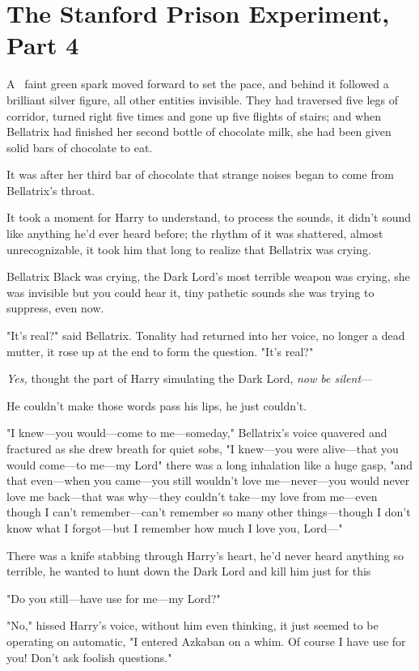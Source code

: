 \chapter{The Stanford Prison Experiment, Part 4}

\lettrine{A}{~} faint green
spark moved forward to set the pace, and behind it followed a brilliant silver
figure, all other entities invisible. They had traversed five legs of corridor,
turned right five times and gone up five flights of stairs; and when Bellatrix
had finished her second bottle of chocolate milk, she had been given solid bars
of chocolate to eat.

It was after her third bar of chocolate that strange noises began to come from
Bellatrix's throat.

It took a moment for Harry to understand, to process the sounds, it didn't
sound like anything he'd ever heard before; the rhythm of it was shattered,
almost unrecognizable, it took him that long to realize that Bellatrix was
crying.

Bellatrix Black was crying, the Dark Lord's most terrible weapon was crying,
she was invisible but you could hear it, tiny pathetic sounds she was trying to
suppress, even now.

"It's real?" said Bellatrix. Tonality had returned into her voice, no longer a
dead mutter, it rose up at the end to form the question. "It's real?"

\emph{Yes,} thought the part of Harry simulating the Dark Lord, \emph{now be
silent}---

He couldn't make those words pass his lips, he just couldn't.

"I knew---you would---come to me---someday," Bellatrix's voice quavered and
fractured as she drew breath for quiet sobs, "I knew---you were alive---that
you would come---to me---my Lord{\el}" there was a long inhalation like a
huge gasp, "and that even---when you came---you still wouldn't love
me---never---you would never love me back---that was why---they couldn't
take---my love from me---even though I can't remember---can't remember so many
other things---though I don't know what I forgot---but I remember how much I
love you, Lord---"

There was a knife stabbing through Harry's heart, he'd never heard anything so
terrible, he wanted to hunt down the Dark Lord and kill him just for
this{\el}

"Do you still---have use for me---my Lord?"

"No," hissed Harry's voice, without him even thinking, it just seemed to be
operating on automatic, "I entered Azkaban on a whim. Of course I have use for
you! Don't ask foolish questions."

